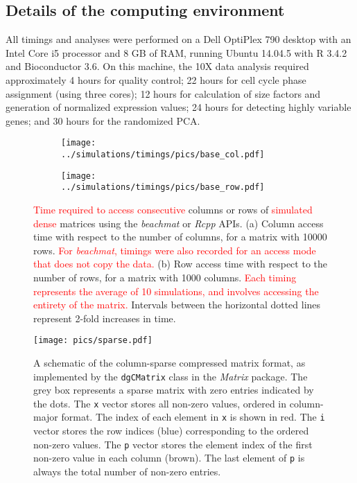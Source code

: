 \documentclass{article}
\newcommand{\beachmat}{\textit{beachmat}}
\newcommand{\revised}[1]{\textcolor{red}{#1}}
\begin{document}
\subsection{Details of the computing environment}
\label{sec:systemdetails}
All timings and analyses were performed on a Dell OptiPlex 790 desktop with an Intel Core i5 processor and 8 GB of RAM, running Ubuntu 14.04.5 with R 3.4.2 and Bioconductor 3.6.
On this machine, the 10X data analysis required approximately 4 hours for quality control;
22 hours for cell cycle phase assignment (using three cores);
12 hours for calculation of size factors and generation of normalized expression values;
24 hours for detecting highly variable genes;
and 30 hours for the randomized PCA.




\newpage

\begin{figure}[bt]
    \centering
    \begin{subfigure}[b]{0.49\textwidth}
        \texttt{[image: ../simulations/timings/pics/base\_col.pdf]}
        \caption{}
    \end{subfigure}
    \begin{subfigure}[b]{0.49\textwidth}
        \texttt{[image: ../simulations/timings/pics/base\_row.pdf]}
        \caption{}
    \end{subfigure}
    \caption{\revised{Time required to access consecutive} columns or rows of \revised{simulated dense} matrices using the \beachmat{} or \textit{Rcpp} APIs.
        (a) Column access time with respect to the number of columns, for a matrix with 10000 rows.
        \revised{For \beachmat{}, timings were also recorded for an access mode that does not copy the data.}
        (b) Row access time with respect to the number of rows, for a matrix with 1000 columns.
        \revised{Each timing represents the average of 10 simulations, and involves accessing the entirety of the matrix.}
        Intervals between the horizontal dotted lines represent 2-fold increases in time.
    }
    \label{fig:basetime}
\end{figure}

\begin{figure}[bt]
    \centering
    \texttt{[image: pics/sparse.pdf]}
    \caption{A schematic of the column-sparse compressed matrix format, as implemented by the \texttt{dgCMatrix} class in the \textit{Matrix} package.
        The grey box represents a sparse matrix with zero entries indicated by the dots.
        The \texttt{x} vector stores all non-zero values, ordered in column-major format.
        The index of each element in \texttt{x} is shown in red.
        The \texttt{i} vector stores the row indices (blue) corresponding to the ordered non-zero values.
        The \texttt{p} vector stores the element index of the first non-zero value in each column (brown).
        The last element of \texttt{p} is always the total number of non-zero entries.
    }
    \label{fig:sparsefig}
\end{figure}
\end{document}
